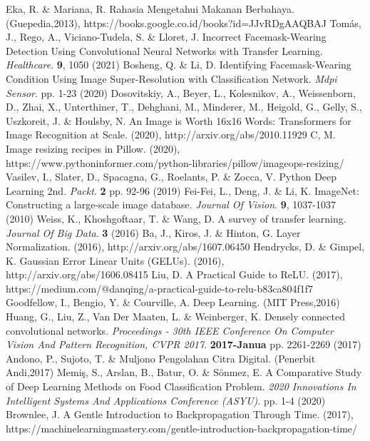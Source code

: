 \documentclass{article}
\begin{document}
\begin{thebibliography}{1}
	Eka, R. \& Mariana, R. Rahasia Mengetahui Makanan Berbahaya. (Guepedia,2013), https://books.google.co.id/books?id=JJvRDgAAQBAJ
	Tomás, J., Rego, A., Viciano-Tudela, S. \& Lloret, J. Incorrect Facemask-Wearing Detection Using Convolutional Neural Networks with Transfer Learning. {\em Healthcare}. \textbf{9}, 1050 (2021)
	Bosheng, Q. \& Li, D. Identifying Facemask-Wearing Condition Using Image Super-Resolution with Classification Network. {\em Mdpi Sensor}. pp. 1-23 (2020)
	Dosovitskiy, A., Beyer, L., Kolesnikov, A., Weissenborn, D., Zhai, X., Unterthiner, T., Dehghani, M., Minderer, M., Heigold, G., Gelly, S., Uszkoreit, J. \& Houlsby, N. An Image is Worth 16x16 Words: Transformers for Image Recognition at Scale.  (2020), http://arxiv.org/abs/2010.11929
	C, M. Image resizing recipes in Pillow.  (2020), https://www.pythoninformer.com/python-libraries/pillow/imageops-resizing/
	Vasilev, I., Slater, D., Spacagna, G., Roelants, P. \& Zocca, V. Python Deep Learning 2nd. {\em Packt}. \textbf{2} pp. 92-96 (2019)
	Fei-Fei, L., Deng, J. \& Li, K. ImageNet: Constructing a large-scale image database. {\em Journal Of Vision}. \textbf{9}, 1037-1037 (2010)
	Weiss, K., Khoshgoftaar, T. \& Wang, D. A survey of transfer learning. {\em Journal Of Big Data}. \textbf{3} (2016)
	Ba, J., Kiros, J. \& Hinton, G. Layer Normalization.  (2016), http://arxiv.org/abs/1607.06450
	Hendrycks, D. \& Gimpel, K. Gaussian Error Linear Units (GELUs).  (2016), http://arxiv.org/abs/1606.08415
	Liu, D. A Practical Guide to ReLU.  (2017), https://medium.com/@danqing/a-practical-guide-to-relu-b83ca804f1f7
	Goodfellow, I., Bengio, Y. \& Courville, A. Deep Learning. (MIT Press,2016)
	Huang, G., Liu, Z., Van Der Maaten, L. \& Weinberger, K. Densely connected convolutional networks. {\em Proceedings - 30th IEEE Conference On Computer Vision And Pattern Recognition, CVPR 2017}. \textbf{2017-Janua} pp. 2261-2269 (2017)
	Andono, P., Sujoto, T. \& Muljono Pengolahan Citra Digital. (Penerbit Andi,2017)
	Memiş, S., Arslan, B., Batur, O. \& Sönmez, E. A Comparative Study of Deep Learning Methods on Food Classification Problem. {\em 2020 Innovations In Intelligent Systems And Applications Conference (ASYU)}. pp. 1-4 (2020)
	Brownlee, J. A Gentle Introduction to Backpropagation Through Time.  (2017), https://machinelearningmastery.com/gentle-introduction-backpropagation-time/

\end{thebibliography}
\end{document}
